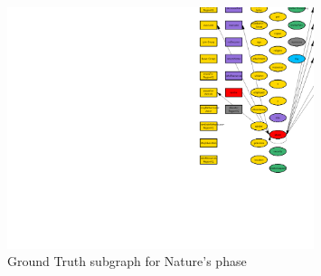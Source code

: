 \documentclass{article}%
\begin{document}
\begin{figure}[ht]%
\centering%
\includegraphics[width=0.8\textwidth]{images/phaseOfNature.png}%
\caption{Ground Truth subgraph for Nature's phase}%
\end{figure}

%
\end{document}
